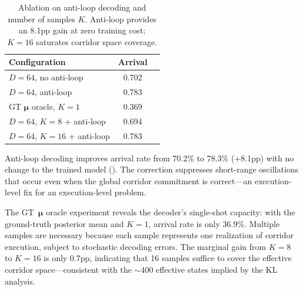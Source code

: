\begin{table}[t]
  \caption{Ablation on anti-loop decoding and number of samples $K$. Anti-loop provides an 8.1pp gain at zero training cost; $K\!=\!16$ saturates corridor space coverage.}
  \label{tab:ablation-k}
  \vskip 0.1in
  \centering
  \small
  \begin{tabular}{lcc}
    \toprule
    Configuration & Arrival \\
    \midrule
    $D\!=\!64$, no anti-loop         & 0.702 \\
    $D\!=\!64$, anti-loop             & 0.783 \\
    \midrule
    GT $\boldsymbol{\mu}$ oracle, $K\!=\!1$ & 0.369 \\
    $D\!=\!64$, $K\!=\!8$ + anti-loop  & 0.694 \\
    $D\!=\!64$, $K\!=\!16$ + anti-loop & 0.783 \\
    \bottomrule
  \end{tabular}
  \vskip -0.1in
\end{table}

Anti-loop decoding improves arrival rate from 70.2\% to 78.3\% (+8.1pp) with no change to the trained model ().
The correction suppresses short-range oscillations that occur even when the global corridor commitment is correct---an execution-level fix for an execution-level problem.

The GT~$\boldsymbol{\mu}$ oracle experiment reveals the decoder's single-shot capacity: with the ground-truth posterior mean and $K\!=\!1$, arrival rate is only 36.9\%.
Multiple samples are necessary because each sample represents one realization of corridor execution, subject to stochastic decoding errors.
The marginal gain from $K\!=\!8$ to $K\!=\!16$ is only 0.7pp, indicating that 16 samples suffice to cover the effective corridor space---consistent with the $\sim\!400$ effective states implied by the KL analysis.
